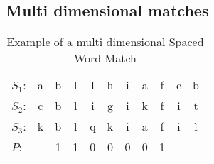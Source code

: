 \subsection{Multi dimensional matches}

\begin{table}[H]
	\centering
	\begin{tabular}{ l c c c c c c c c c c}
		$S_1$: & a&b&l&l&h&i&a&f&c&b \\ 
		$S_2$: & c&b&l&i&g&i&k&f&i&t \\
		$S_3$: & k&b&l&q&k&i&a&f&i&l \\
		$P$: &    &1&1&0&0&0&0&1
	\end{tabular}
	\caption{Example of a multi dimensional Spaced Word Match}
	\label{tab:spaced-word}
\end{table}
